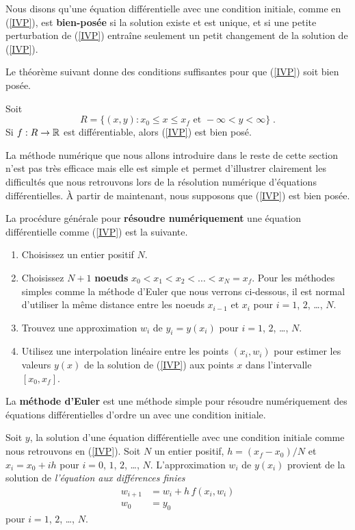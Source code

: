 {Nous disons qu'une équation différentielle avec une condition initiale,
comme en (\ref{IVP}), est {\bfseries bien-posée} si la solution existe
et est unique, et si une petite perturbation de (\ref{IVP}) entraîne
seulement un petit changement de la solution de (\ref{IVP}).

Le théorème suivant donne des conditions suffisantes pour que
(\ref{IVP}) soit bien posée.

\begin{focus}[\theory]{\thm}
Soit
\[
R = \{(x,y) : x_0 \leq x \leq x_f \text{ et } -\infty < y < \infty \} \; .
\]
Si $f:R \rightarrow \mathbb{R}$ est différentiable, alors (\ref{IVP}) est
bien posé.
\end{focus}

La méthode numérique que nous allons introduire dans le reste de cette
section n'est pas très efficace mais elle est simple et permet
d'illustrer clairement les difficultés que nous retrouvons lors de la
résolution numérique d'équations différentielles.  À partir de
maintenant, nous supposons que (\ref{IVP}) est bien posée.

La procédure générale pour {\bfseries résoudre numériquement} une
équation différentielle comme (\ref{IVP}) est la suivante.
\begin{enumerate}
\item Choisissez un entier positif $N$.
\item Choisissez $N+1$ {\bfseries noeuds}
$x_0 < x_1 < x_2 <\ldots< x_N = x_f$.  Pour les méthodes simples comme
la méthode d'Euler que nous verrons ci-dessous, il est normal
d'utiliser la même distance entre les noeuds $x_{i-1}$ et $x_i$ pour
$i=1$, $2$, \ldots, $N$.
\item Trouvez une approximation $w_i$ de $y_i = y(x_i)$ pour
$i=1$, $2$, \ldots, $N$.
\item Utilisez une interpolation linéaire entre les points
$(x_i,w_i)$ pour estimer les valeurs $y(x)$ de la solution de
(\ref{IVP}) aux points $x$ dans l'intervalle $[x_0,x_f]$.
\end{enumerate}

La {\bfseries méthode d'Euler} est une méthode simple pour résoudre
numériquement des équations différentielles d'ordre un avec une
condition initiale.

\begin{focus}{\mth} 
Soit $y$, la solution d'une équation différentielle avec une condition
initiale comme nous retrouvons en (\ref{IVP}).  Soit $N$ un entier
positif, $h=(x_f-x_0)/N$ et $x_i=x_0+ih$ pour $i=0$, $1$, $2$, \ldots,
$N$.  L'approximation $w_i$ de $y(x_i)$ provient de la solution de
{\em l'équation aux différences finies}
\begin{equation} \label{Euleralgor}
\begin{split}
w_{i+1} & = w_i + h \, f(x_i, w_i) \\
w_0 & = y_0
\end{split}
\end{equation}
pour $i=1$, $2$, \ldots, $N$.
\end{focus}

}
